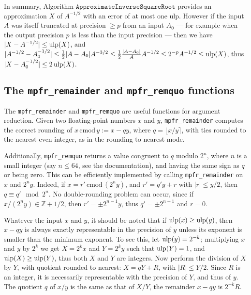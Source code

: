 \documentclass[12pt]{amsart}
\def\ulp{{\rm ulp}}
\def\cmod{\,\mathrm{cmod}\,}
\begin{document}
\medskip

In summary, Algorithm $\texttt{ApproximateInverseSquareRoot}$ provides an
approximation $X$ of $A^{-1/2}$ with an error of at most one ulp.
However if the input $A$ was itself truncated at precision $\geq p$
from an input $A_0$ ---
for example when the output precision $p$ is less than the input precision ---
then we have $|X - A^{-1/2}| \leq \ulp(X)$, and
$|A^{-1/2} - A_0^{-1/2}| \leq \frac{1}{2} |A - A_0| A^{-3/2}
\leq \frac{1}{2} \frac{|A - A_0|}{A} A^{-1/2}
\leq 2^{-p} A^{-1/2} \leq \ulp(X)$, thus
$|X - A_0^{-1/2}| \leq 2 \, \ulp(X)$.

\subsection{The \texttt{mpfr\_remainder} and \texttt{mpfr\_remquo} functions}

The \texttt{mpfr\_remainder} and \texttt{mpfr\_remquo} are useful
functions for argument reduction. Given two floating-point numbers $x$ and
$y$, \texttt{mpfr\_remainder} computes the correct rounding of
$x \cmod y := x - q y$, where
$q = \lfloor x/y \rceil$, with ties rounded to the nearest even integer,
as in the rounding to nearest mode.

Additionally, \texttt{mpfr\_remquo} returns a value congruent to $q$
modulo $2^n$, where $n$ is a small integer (say $n \leq 64$, see the
documentation), and having the same sign as $q$ or being zero.
This can be efficiently implemented by calling \texttt{mpfr\_remainder} on
$x$ and $2^n y$. Indeed, if $x = r' \cmod (2^n y)$, and
$r' = q' y + r$ with $|r| \leq y/2$, then
$q \equiv q' \mod 2^n$. No double-rounding problem can occur, since if
$x/(2^n y) \in {\mathbb Z} + 1/2$,
then $r'=\pm 2^{n-1} y$, thus $q'=\pm 2^{n-1}$ and $r=0$.

Whatever the input $x$ and $y$, it should be noted that if $\ulp(x) \geq
\ulp(y)$, then $x - q y$ is always
exactly representable in the precision of $y$ unless its exponent is smaller
than the minimum exponent. To see this,
let $\ulp(y) = 2^{-k}$;
multiplying $x$ and $y$ by $2^k$ we get $X = 2^k x$ and
$Y = 2^k y$ such that $\ulp(Y)=1$,
and $\ulp(X) \geq \ulp(Y)$, thus both $X$ and $Y$ are integers.
Now perform the division of $X$ by $Y$, with quotient rounded to nearest:
$X = q Y + R$, with $|R| \leq Y/2$. Since $R$ is an integer, it is
necessarily representable with the precision of $Y$, and thus of $y$.
The quotient $q$ of $x/y$ is the same as that of $X/Y$, the remainder
$x - q y$ is $2^{-k} R$.
\end{document}
